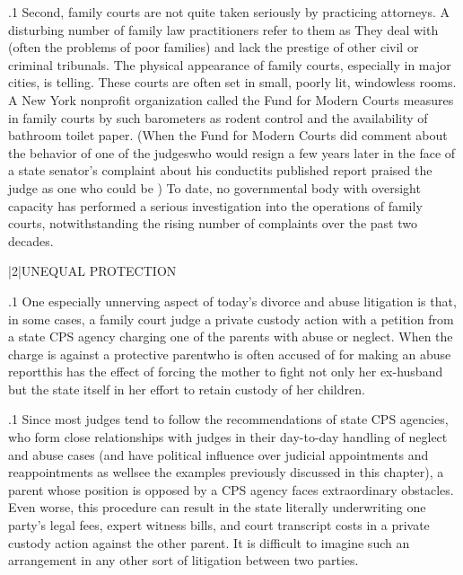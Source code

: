 \documentclass[11pt, twoside]{article}
\begin{document}
{\p.1{%
Second, family courts are not quite taken seriously by practicing attorneys. A disturbing number of family law practitioners refer to them
as  They deal with  (often the problems of poor families) and lack the prestige of other civil or criminal
tribunals. The physical appearance of family courts, especially in major
cities, is telling. These courts are often set in small, poorly lit, windowless
rooms. A New York nonprofit organization called the Fund for Modern
Courts measures  in family courts by such barometers
as rodent control and the availability of bathroom toilet paper. (When
the Fund for Modern Courts did comment about the behavior of one
of the judges\mdash{}who would resign a few years later in the face of a state
senator’s complaint about his conduct\mdash{}its published report praised the
judge as one who could be ) To date, no governmental body with oversight
capacity has performed a serious investigation into the operations of
family courts, notwithstanding the rising number of complaints over
the past two decades.
}%


\s|2|{UNEQUAL PROTECTION}

\p.1{%
One especially unnerving aspect of today’s divorce and abuse litigation
is that, in some cases, a family court judge  a private custody action with a petition from a state CPS agency charging one of the
parents with abuse or neglect. When the charge is against a protective
parent\mdash{}who is often accused of  for making an
abuse report\mdash{}this has the effect of forcing the mother to fight not only
her ex-husband but the state itself in her effort to retain custody of her
children.
}%

\p.1{%
Since most judges tend to follow the recommendations of state CPS
agencies, who form close relationships with judges in their day-to-day
handling of neglect and abuse cases (and have political influence over
judicial appointments and reappointments as well\mdash{}see the examples
previously discussed in this chapter), a parent whose position is opposed
by a CPS agency faces extraordinary obstacles. Even worse, this procedure can result in the state literally underwriting one party’s legal fees,
expert witness bills, and court transcript costs in a private custody action
against the other parent. It is difficult to imagine such an arrangement
in any other sort of litigation between two parties.
}%

}
\end{document}
